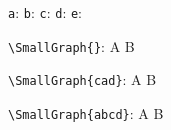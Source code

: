 \documentclass{article}
\begin{document}
\linespread{2}\selectfont

\texttt{a}:  \quad
\texttt{b}:  \quad
\texttt{c}:  \quad  
\texttt{d}:  \quad
\texttt{e}:  

\hrulefill

\verb|\SmallGraph{}|: A \SmallGraph{} B

\verb|\SmallGraph{cad}|: A  B

\verb|\SmallGraph{abcd}|: A  B
\end{document}
